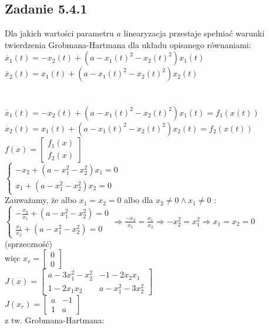 \subsection*{Zadanie 5.4.1} {\color{darkgray}
	Dla jakich wartości parametru $a$ linearyzacja przestaje spełniać warunki twierdzenia Grobmana-Hartmana dla układu opisanego równaniami:\\
	$\dot{x_1}(t)=-x_2(t)+(a-x_1(t)^2-x_2(t)^2)x_1(t)$\\
	$\dot{x_2}(t)=x_1(t)+(a-x_1(t)^2-x_2(t)^2)x_2(t)$\\
}\\\\
$\dot{x_1}(t)=-x_2(t)+(a-x_1(t)^2-x_2(t)^2)x_1(t)=f_1(x(t))$\\
$\dot{x_2}(t)=x_1(t)+(a-x_1(t)^2-x_2(t)^2)x_2(t)=f_2(x(t))$\\
$f(x)=\left[ \begin{array}{c}     f_1(x) \\ f_2(x)   \end{array}\right]$\\
$\begin{cases} -x_2+(a-x_1^2-x_2^2)x_1=0 \\ x_1+(a-x_1^2-x_2^2)x_2=0\end{cases}  $\\
Zauważamy, że albo $x_1=x_2=0$ albo dla $x_2 \neq 0 \wedge x_1 \neq 0$ :\\
$\begin{cases} -\frac{x_2}{x_1}+(a-x_1^2-x_2^2)=0 \\ \frac{x_1}{x_2}+(a-x_1^2-x_2^2)=0\end{cases}  \Rightarrow \frac{-x_2}{x_1} = \frac{x_1}{x_2} \Rightarrow -x_2^2=x_1^2 \Rightarrow x_1=x_2=0$ (sprzeczność)\\
więc $x_r=\left[ \begin{array}{c}     0\\0   \end{array}\right]$\\
$J(x)=\left[ \begin{array}{cc}   a-3x_1^2-x_2^2 & -1-2x_2x_1 \\ 1-2x_1x_2 & a-x_1^2-3x_2^2    \end{array}\right]$\\
$J(x_r)=\left[ \begin{array}{cc}    a & -1 \\ 1 & a    \end{array}\right]$\\
z tw. Grobmana-Hartmana:\\
